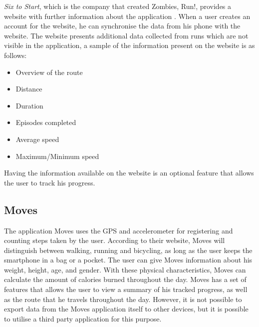\textit{Six to Start}, which is the company that created Zombies, Run!, provides a website with further information about the application \citep{misc:zombiesrun}.
When a user creates an account for the website, he can synchronise the data from his phone with the website. 
The website presents additional data collected from runs which are not visible in the application, a sample of the information present on the website is as follows:

\begin{itemize}
\item Overview of the route
\item Distance
\item Duration
\item Episodes completed
\item Average speed
\item Maximum/Minimum speed
\end{itemize}

Having the information available on the website is an optional feature that allows the user to track his progress.



\subsection{Moves}
The application Moves \citep{misc:Moves} uses the GPS and accelerometer for registering and counting steps taken by the user.
According to their website, Moves will distinguish between walking, running and bicycling, as long as the user keeps the smartphone in a bag or a pocket.
The user can give Moves information about his weight, height, age, and gender. 
With these physical characteristics, Moves can calculate the amount of calories burned throughout the day.
Moves has a set of features that allows the user to view a summary of his tracked progress, as well as the route that he travels throughout the day.
However, it is not possible to export data from the Moves application itself to other devices, but it is possible to utilise a third party application for this purpose.



